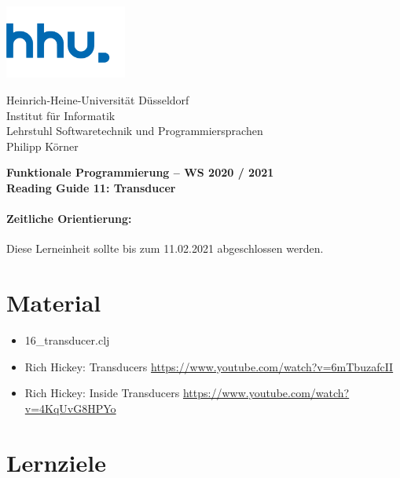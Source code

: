 \documentclass[11pt,a4paper]{article}
\theoremstyle{break}
\begin{document}
\begin{minipage}[b]{\textwidth}
\parbox[t]{5cm}{%
\includegraphics[width=4cm]{unilogo}
\hfill
}
\parbox[b]{11cm}{%
Heinrich-Heine-Universit\"at D\"usseldorf\\
Institut f\"ur Informatik\\
Lehrstuhl Softwaretechnik und Programmiersprachen\\
Philipp K\"orner
}

\end{minipage}
\begin{center}
\bf
Funktionale Programmierung -- WS 2020 / 2021\\
Reading Guide 11: Transducer
\end{center}

\pagestyle{empty}

\paragraph{Zeitliche Orientierung:} Diese Lerneinheit sollte bis zum 11.02.2021 abgeschlossen werden.

\section{Material} 

\begin{itemize}
    \item 16\_transducer.clj
    \item Rich Hickey: Transducers \url{https://www.youtube.com/watch?v=6mTbuzafcII}
    \item Rich Hickey: Inside Transducers \url{https://www.youtube.com/watch?v=4KqUvG8HPYo}
\end{itemize}


\section{Lernziele}
\end{document}
